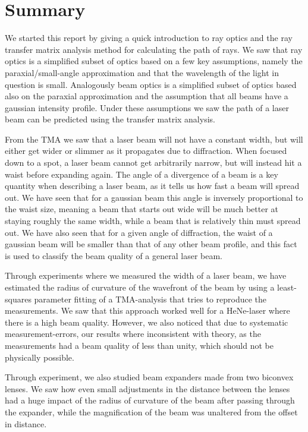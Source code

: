 \documentclass[a4paper, 11pt, notitlepage, english]{article}
\begin{document}
\clearpage

\section{Summary}

We started this report by giving a quick introduction to ray optics and the ray transfer matrix analysis method for calculating the path of rays. We saw that ray optics is a simplified subset of optics based on a few key assumptions, namely the paraxial/small-angle approximation and that the wavelength of the light in question is small. Analogously beam optics is a simplified subset of optics based also on the paraxial approximation and the assumption that all beams have a gaussian intensity profile. Under these assumptions we saw the path of a laser beam can be predicted using the transfer matrix analysis. 

From the TMA we saw that a laser beam will not have a constant width, but will either get wider or slimmer as it propagates due to diffraction. When focused down to a spot, a laser beam cannot get arbitrarily narrow, but will instead hit a waist before expanding again. The angle of a divergence of a beam is a key quantity when describing a laser beam, as it tells us how fast a beam will spread out. We have seen that for a gaussian beam this angle is inversely proportional to the waist size, meaning a beam that starts out wide will be much better at staying roughly the same width, while a beam that is relatively thin must spread out. We have also seen that for a given angle of diffraction, the waist of a gaussian beam will be smaller than that of any other beam profile, and this fact is used to classify the beam quality of a general laser beam.

Through experiments where we measured the width of a laser beam, we have estimated the radius of curvature of the wavefront of the beam by using a least-squares parameter fitting of a TMA-analysis that tries to reproduce the measurements. We saw that this approach worked well for a HeNe-laser where there is a high beam quality. However, we also noticed that due to systematic measurement-errors, our results where inconsistent with theory, as the measurements had a beam quality of less than unity, which should not be physically possible.

Through experiment, we also studied beam expanders made from two biconvex lenses. We saw how even small adjustments in the distance between the lenses had a huge impact of the radius of curvature of the beam after passing through the expander, while the magnification of the beam was unaltered from the offset in distance.
\end{document}
